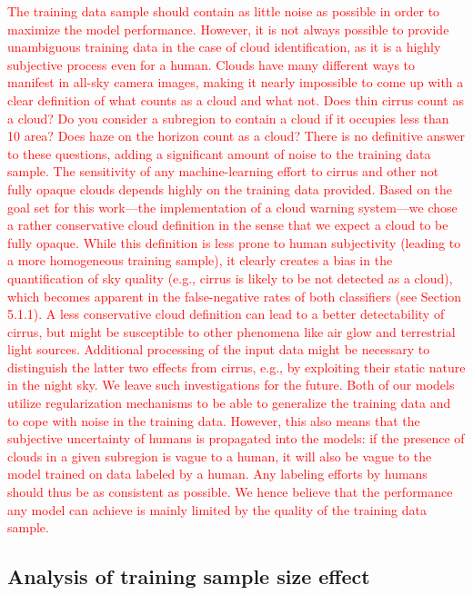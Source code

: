 \documentclass[amt, article]{copernicus}
\begin{document}
\textcolor{red}{
The training data sample should contain as little noise as
possible in order to maximize the model performance.
However, it is not always possible to provide unambiguous
training data in the case of cloud identification, as it is a highly
subjective process even for a human.
Clouds have many different ways to manifest in all-sky
camera images, making it nearly impossible to come up with a
clear definition of what counts as a cloud and what not. Does
thin cirrus count as a cloud? Do you consider a subregion to
contain a cloud if it occupies less than 10%
area? Does haze on the horizon count as a cloud? There is no
definitive answer to these questions, adding a significant
amount of noise to the training data sample.
The sensitivity of any machine-learning effort to cirrus and
other not fully opaque clouds depends highly on the training
data provided. Based on the goal set for this work—the
implementation of a cloud warning system—we chose a rather
conservative cloud definition in the sense that we expect a
cloud to be fully opaque. While this definition is less prone to
human subjectivity (leading to a more homogeneous training
sample), it clearly creates a bias in the quantification of sky
quality (e.g., cirrus is likely to be not detected as a cloud),
which becomes apparent in the false-negative rates of both
classifiers (see Section 5.1.1). A less conservative cloud
definition can lead to a better detectability of cirrus, but might
be susceptible to other phenomena like air glow and terrestrial
light sources. Additional processing of the input data might be
necessary to distinguish the latter two effects from cirrus, e.g.,
by exploiting their static nature in the night sky. We leave such
investigations for the future.
Both of our models utilize regularization mechanisms to be
able to generalize the training data and to cope with noise in the
training data. However, this also means that the subjective
uncertainty of humans is propagated into the models: if the
presence of clouds in a given subregion is vague to a human, it
will also be vague to the model trained on data labeled by a
human. Any labeling efforts by humans should thus be as
consistent as possible.
We hence believe that the performance any model can
achieve is mainly limited by the quality of the training data
sample.}

\subsection{Analysis of training sample size effect}
\end{document}
